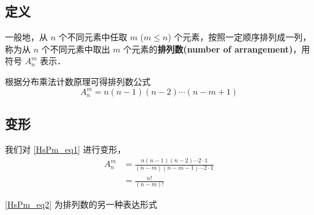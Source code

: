 
\subsection{定义}

一般地，从 $n$ 个不同元素中任取 $m$ ($m \leq n$) 个元素，按照一定顺序排列成一列，称为从 $n$ 个不同元素中取出 $m$ 个元素的\textbf{排列数(number of arrangement)}，用符号 $A_n^m$ 表示．

根据分布乘法计数原理可得排列数公式\begin{equation}\label{HsPm_eq1}
A_n^m = n (n - 1)(n - 2) \cdots (n - m + 1)
\end{equation}

\subsection{变形}
我们对 \autoref{HsPm_eq1} 进行变形，\begin{equation}\label{HsPm_eq2}
\begin{aligned}
A_n^m &= \frac{n(n - 1)(n - 2) \cdots 2 \cdot 1}{(n - m)(n - m - 1) \cdots 2 \cdot 1}\\
&= \frac{n!}{(n - m)!}
\end{aligned}
\end{equation}

\autoref{HsPm_eq2} 为排列数的另一种表达形式